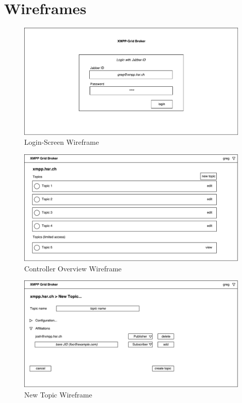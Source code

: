 
\section{Wireframes}\label{sec:wireframes}

\begin{figure}[h]
    \centering
    \includegraphics[width=1\linewidth]{resources/wireframe_1}
    \caption{Login-Screen Wireframe}
\end{figure}

\begin{figure}[h]
    \centering
    \includegraphics[width=1\linewidth]{resources/wireframe_2}
    \caption{Controller Overview Wireframe}
\end{figure}

\begin{figure}[h]
    \centering
    \includegraphics[width=1\linewidth]{resources/wireframe_3}
    \caption{New Topic Wireframe}
\end{figure}

